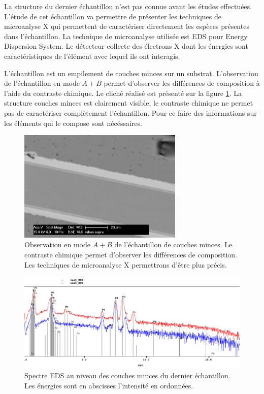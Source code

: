 \documentclass[a4paper,12pt]{article}
\begin{document}
La structure du dernier échantillon n'est pas connue avant les études effectuées.
L'étude de cet échantillon va permettre de présenter les techniques de microanlyse
X qui permettent de caractériser directement les espèces présentes dans l'échantillon.
La technique de microanalyse utilisée est EDS pour Energy Dispersion System. Le
détecteur collecte des électrons X dont les énergies sont caractéristiques de l'élément
avec lequel ils ont interagis.

L'échantillon est un empilement de couches minces sur un substrat. L'observation de
l'échantillon en mode $A+B$ permet d'observer les différences de composition à l'aide
du contraste chimique. Le cliché réalisé est présenté sur la figure \ref{fig:sec_er_apb}.
La structure couches minces est clairement visible, le contraste chimique ne permet pas
de caractériser complètement l'échantillon. Pour ce faire des informations sur les éléments
qui le compose sont nécéssaires.


\begin{figure}
\centering
\includegraphics[width=0.7\textwidth]{images/sec_er_apb_1.png}
\caption{Observation en mode $A+B$ de l'échantillon de couches minces. Le contraste chimique permet d'observer les différences de composition. Les techniques de microanalyse X permettrons d'être plus précis.}
\label{fig:sec_er_apb}
\end{figure}



\begin{figure}
\centering
\includegraphics[width=\textwidth]{images/im2.png}
\caption{Spectre EDS au niveau des couches minces du dernier échantillon. Les énergies sont en abscisses l'intensité en ordonnées.}
\label{fig:spectre_1}
\end{figure}
\end{document}
